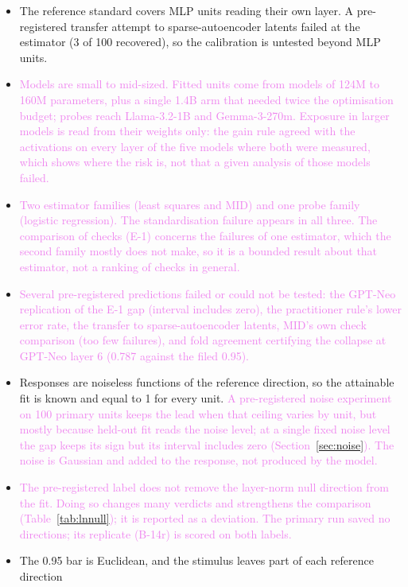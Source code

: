 \documentclass[10pt]{article}
\newcommand{\draft}[1]{\textcolor{violet}{#1}}
\begin{document}
\begin{itemize}
  \item The reference standard covers MLP units reading their own layer. A pre-registered
  transfer attempt to sparse-autoencoder latents failed at the estimator (3 of 100 recovered),
  so the calibration is untested beyond MLP units.
  \item \draft{Models are small to mid-sized. Fitted units come from models of 124M to 160M
  parameters, plus a single 1.4B arm that needed twice the optimisation budget; probes reach
  Llama-3.2-1B and Gemma-3-270m. Exposure in larger models is read from their weights only: the
  gain rule agreed with the activations on every layer of the five models where both were measured,
  which shows where the risk is, not that a given analysis of those models failed.}
  \item \draft{Two estimator families (least squares and MID) and one probe family (logistic
  regression). The standardisation failure appears in all three. The comparison of checks (E-1)
  concerns the failures of one estimator, which the second family mostly does not make, so it is a
  bounded result about that estimator, not a ranking of checks in general.}
  \item \draft{Several pre-registered predictions failed or could not be tested: the GPT-Neo
  replication of the E-1 gap (interval includes zero), the practitioner rule's lower error rate,
  the transfer to sparse-autoencoder latents, MID's own check comparison (too few failures), and
  fold agreement certifying the collapse at GPT-Neo layer 6 (0.787 against the filed 0.95).}
  \item Responses are noiseless functions of the reference direction, so the attainable fit is
  known and equal to 1 for every unit. \draft{A pre-registered noise experiment on 100 primary
  units keeps the lead when that ceiling varies by unit, but mostly because held-out fit reads
  the noise level; at a single fixed noise level the gap keeps its sign but its interval
  includes zero (Section~\ref{sec:noise}). The noise is
  Gaussian and added to the response, not produced by the model.}
  \item \draft{The pre-registered label does not remove the layer-norm null direction from the
  fit. Doing so changes many verdicts and strengthens the comparison (Table~\ref{tab:lnnull}); it is
  reported as a deviation. The primary run saved no directions; its replicate (B-14r) is scored on
  both labels.}
  \item The 0.95 bar is Euclidean, and the stimulus leaves part of each reference direction

\end{itemize}
\end{document}
